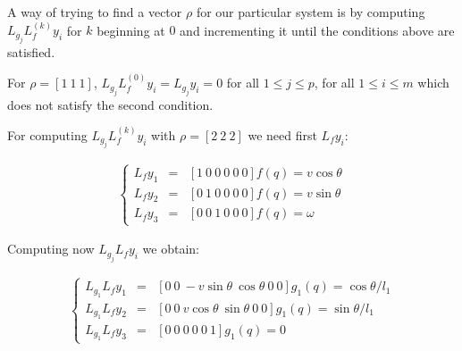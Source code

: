 \documentclass[letterpaper, 10 pt, conference]{ieeeconf}  %
\begin{document}
A way of trying to find a vector $\rho$ for our particular system is by computing $L_{g_j}L_f^{(k)}y_i$ for $k$ beginning at $0$ and incrementing it until the conditions above are satisfied.

For ${\rho = [1\ 1\ 1]}$, ${L_{g_j}L_f^{(0)}y_i = L_{g_j}y_i = 0}$ for all ${1 \leq j \leq p}$, for all ${1 \leq i \leq m}$ which does not satisfy the second condition.

%

For computing $L_{g_j}L_f^{(k)}y_i$ with $\rho = [2\ 2\ 2]$ we need first $L_fy_i$:

\begin{eqnarray}
\left\lbrace\begin{array}{lcl}
L_{f}y_1 & = & [1\ 0\ 0\ 0\ 0\ 0]f(q) = v\cos\theta\\
L_{f}y_2 & = & [0\ 1\ 0\ 0\ 0\ 0]f(q) = v\sin\theta\\
L_{f}y_3 & = & [0\ 0\ 1\ 0\ 0\ 0]f(q) = \omega
\end{array}\right.
\end{eqnarray}

Computing now $L_{g_j}L_fy_i$ we obtain:

\begin{eqnarray}
\left\lbrace\begin{array}{lcl}
L_{g_1}L_{f}y_1 & = & [0\ 0\ -v\sin\theta\ \cos\theta\ 0\ 0]g_1(q) = \cos\theta/l_1\\
L_{g_1}L_{f}y_2 & = & [0\ 0\ v\cos\theta\ \sin\theta\ 0\ 0]g_1(q) = \sin\theta/l_1\\
L_{g_1}L_{f}y_3 & = & [0\ 0\ 0\ 0\ 0\ 1]g_1(q) = 0
\end{array}\right.
\end{eqnarray}
\end{document}

